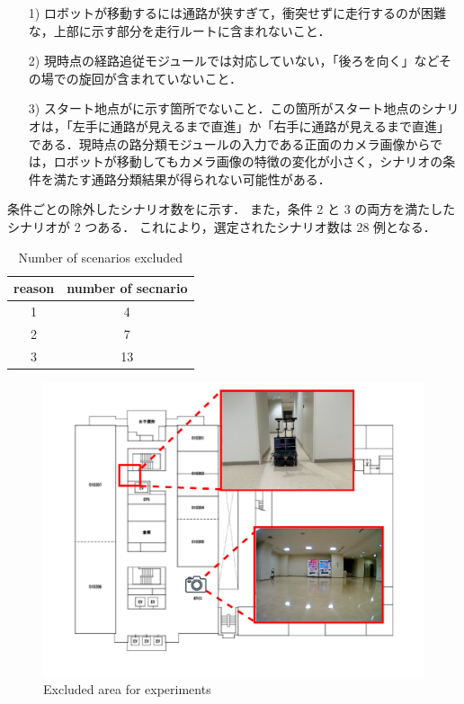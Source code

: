\begin{enumerate}
  \item [1)] ロボットが移動するには通路が狭すぎて，衝突せずに走行するのが困難な，上部に示す部分を走行ルートに含まれないこと．
  \item [2)] 現時点の経路追従モジュールでは対応していない，「後ろを向く」などその場での旋回が含まれていないこと．
  \item [3)] スタート地点がに示す箇所でないこと．この箇所がスタート地点のシナリオは，「左手に通路が見えるまで直進」か「右手に通路が見えるまで直進」である．現時点の路分類モジュールの入力である正面のカメラ画像からでは，ロボットが移動してもカメラ画像の特徴の変化が小さく，シナリオの条件を満たす通路分類結果が得られない可能性がある．
\end{enumerate}

条件ごとの除外したシナリオ数をに示す．
また，条件 2 と 3 の両方を満たしたシナリオが 2 つある． 
これにより，選定されたシナリオ数は 28 例となる．
\begin{table}[htbp]
  \centering
  \caption{Number of scenarios excluded}\label{tab:remove}
  \begin{tabular}{c|c}
  \hline
  reason & number of secnario\\
  \hline
  1  & 4\\
  2  & 7\\
  3  & 13\\
  \hline
  \end{tabular}
\end{table}

\begin{figure}
  \centering
  \includegraphics[width=130mm]{images/pdf/ishiguro/keepout.pdf}
  \caption{Excluded area for experiments}
  \label{fig:keepout}
\end{figure}

